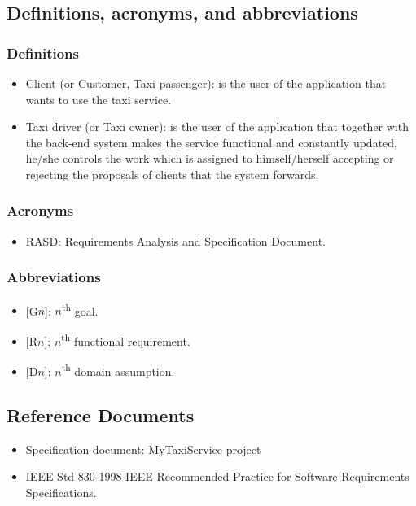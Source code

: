 \documentclass[a4paper,11pt]{report} %
\begin{document}
	\subsection{Definitions, acronyms, and abbreviations}
	
	\subsubsection{Definitions}
		\begin{itemize}
			\item Client (or Customer, Taxi passenger): is the user of the application that wants to use the taxi service.
			\item Taxi driver (or Taxi owner): is the user of the application that together with the back-end system makes the service functional and constantly updated, he/she controls the work which is assigned to himself/herself accepting or rejecting the proposals of clients that the system forwards. 
		\end{itemize}
		
	\subsubsection{Acronyms}
	\begin{itemize}
		\item RASD: Requirements Analysis and Specification Document.
	\end{itemize}
	
		\subsubsection{Abbreviations}
		\begin{itemize}
			\item {[}G$n${]}: $n$\textsuperscript{th} goal.
			\item {[}R$n${]}: $n$\textsuperscript{th} functional requirement.
			\item {[}D$n${]}: $n$\textsuperscript{th} domain assumption.
		\end{itemize}
	
	\subsection{Reference Documents}
		\begin{itemize}
			\item Specification document: MyTaxiService project
			\item IEEE Std 830-1998 IEEE Recommended Practice for Software Requirements	Specifications.
		\end{itemize}
	
\end{document}
